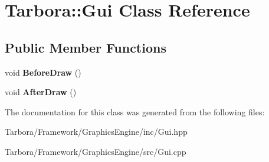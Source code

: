 \hypertarget{classTarbora_1_1Gui}{}\section{Tarbora\+:\+:Gui Class Reference}
\label{classTarbora_1_1Gui}
\subsection*{Public Member Functions}
\begin{DoxyCompactItemize}
\item 
\mbox{\label{classTarbora_1_1Gui_ad54c6113521ed94d15dac59236b75eba}} 
void {\bfseries Before\+Draw} ()
\item 
\mbox{\label{classTarbora_1_1Gui_ada60edc7d56f37a97a966be65c64c74c}} 
void {\bfseries After\+Draw} ()
\end{DoxyCompactItemize}


The documentation for this class was generated from the following files\+:\begin{DoxyCompactItemize}
\item 
Tarbora/\+Framework/\+Graphics\+Engine/inc/Gui.\+hpp\item 
Tarbora/\+Framework/\+Graphics\+Engine/src/Gui.\+cpp\end{DoxyCompactItemize}
